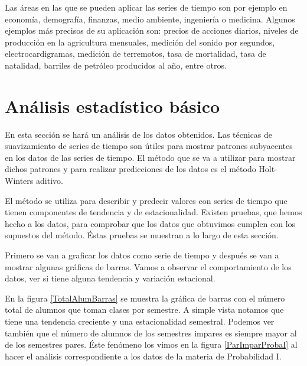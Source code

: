 Las áreas en las que se pueden aplicar las series de tiempo son por ejemplo en economía, demografía, finanzas, medio ambiente, ingeniería o medicina. Algunos ejemplos más precisos de su aplicación son: precios de acciones diarios, niveles de producción en la agricultura mensuales, medición del sonido por segundos, electrocardigramas, medición de terremotos, tasa de mortalidad, tasa de natalidad, barriles de petróleo producidos al año, entre otros.


\section{Análisis estadístico básico}

En esta sección se hará un análisis de los datos obtenidos. Las técnicas de suavizamiento de series de tiempo son útiles para mostrar patrones subyacentes en los datos de las series de tiempo. El método que se va a utilizar para mostrar dichos patrones y para realizar predicciones de los datos es el método Holt-Winters aditivo.


El método se utiliza para describir y predecir valores con series de tiempo que tienen componentes de tendencia y de estacionalidad. Existen pruebas, que hemos hecho a los datos, para comprobar que los datos que obtuvimos cumplen con los supuestos del método. Éstas pruebas se muestran a lo largo de esta sección.

Primero se van a graficar los datos como serie de tiempo y después se van a mostrar algunas gráficas de barras. Vamos a observar el comportamiento de los datos, ver si tiene alguna tendencia y variación estacional.


En la figura \ref{TotalAlumBarras} se muestra la gráfica de barras con el número total de alumnos que toman clases por semestre. A simple vista notamos que tiene una tendencia creciente y una estacionalidad semestral. Podemos ver también que el número de alumnos de los semestres impares es siempre mayor al de los semestres pares. Éste fenómeno los vimos en la figura \ref{ParImparProbaI} al hacer el análisis correspondiente a los datos de la materia de Probabilidad I.

